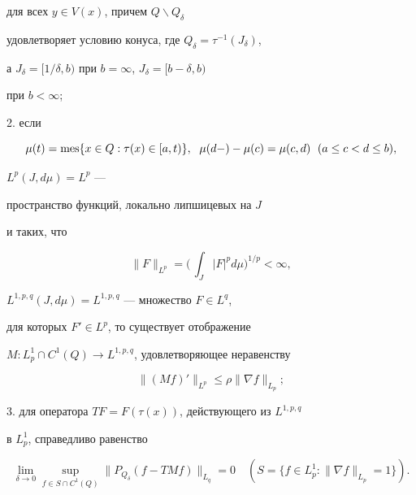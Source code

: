 для всех $y\in V(x)$, причем $Q\backslash Q_{\delta}$


удовлетворяет условию конуса, где $Q_{\delta}=\tau^{-1}(J_{\delta})$,


а $J_{\delta}=[1/\delta ,b)$ при $b=\infty$, $J_{\delta}=[b-\delta ,b)$~


при $b<\infty$;





2. если


\begin{equation}


\mu (t)=\mes\{x\in Q: \tau (x)\in [a,t)\},\ \;


\mu (d-)-\mu (c)=\mu (c,d)\ \; (a\le c<d\le b),


\end{equation}


$L^p(J,d\mu)=L^p$ ---


пространство функций, локально липшицевых на $J$


и таких, что


$$


\|F\|_{L^p}=\biggl(\,\int_J|F|^p d\mu\biggr)^{1/p}<\infty,


$$


$L^{1,p,q}(J,d\mu )=L^{1,p,q}$ --- множество $F\in L^q$,


для которых $F'\in L^p$, то существует отображение


$M:L^1_p\cap C^1(Q)\to L^{1,p,q}$, удовлетворяющее неравенству


\begin{equation}


\|(Mf)'\|_{L^p}\le\rho\|\nabla f\|_{L_p};


\end{equation}





3. для оператора $TF=F(\tau(x))$, действующего из $L^{1,p,q}$


в $L^1_p$, справедливо равенство


\begin{equation}


\lim_{\delta\to 0} \sup\limits_{f\in S\cap C^1(Q)}


\|P_{Q_{\delta}}(f-TMf)\|_{L_q}=0\quad


(S=\{f\in L^1_p:\|\nabla f\|_{L_p}=1\}).


\end{equation}





